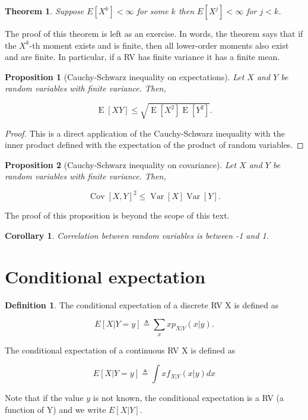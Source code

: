 \documentclass{book}
\theoremstyle{plain}%
\newtheorem{theorem}{Theorem}[section]
\newtheorem{corollary}{Corollary}[section]
\newtheorem{proposition}{Proposition}[section]
\theoremstyle{definition}
\newtheorem{definition}{Definition}[section]
\DeclareMathOperator{\Var}{Var}
\DeclareMathOperator{\Cov}{Cov}
\DeclareMathOperator{\E}{E}
\begin{document}
\begin{theorem} Suppose $E[X^k] < \infty$ for some $k$ then $E[X^j] < \infty$ for $j < k$.\label{thm:moments}
\end{theorem}

The proof of this theorem is left as an exercise. In words, the theorem says that if the $X^k$-th moment exists and is finite, then all lower-order moments also exist and are finite. In particular, if a RV has finite variance it has a finite mean.

\begin{proposition}[Cauchy-Schwarz inequality on expectations]
Let $X$ and $Y$ be random variables with finite variance. Then,

$$\E[XY] \leq \sqrt{\E[X^2]\E[Y^2]}.$$
\end{proposition}

\begin{proof}
This is a direct application of the Cauchy-Schwarz inequality with the inner product defined with the expectation of the product of random variables.
\end{proof}

\begin{proposition}[Cauchy-Schwarz inequality on covariance]
Let $X$ and $Y$ be random variables with finite variance. Then,

$$\Cov[X,Y]^2 \leq \Var[X]\Var[Y].$$
\end{proposition}

The proof of this proposition is beyond the scope of this text.

\begin{corollary}
Correlation between random variables is between -1 and 1.
\end{corollary}

\section{Conditional expectation}

\begin{definition}
The conditional expectation of a discrete RV X is defined as

$$E[X|Y = y] \triangleq \sum_x x p_{X|Y}(x|y).$$

The conditional expectation of a continuous RV X is defined as

$$E[X|Y = y] \triangleq \int x f_{X|Y}(x|y)dx$$
\end{definition}

Note that if the value $y$ is not known, the conditional expectation is a RV (a function of Y) and we write $E[X|Y]$.
\end{document}
